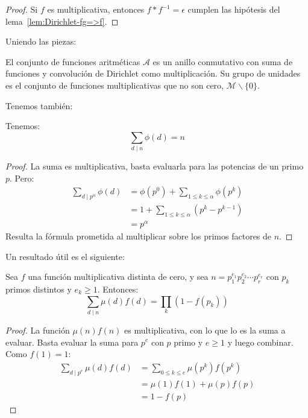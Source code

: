   \begin{proof}
    Si \(f\) es multiplicativa,
    entonces \(f * f^{-1} = \epsilon\)
    cumplen las hipótesis del lema~\ref{lem:Dirichlet-fg=>f}.
  \end{proof}
  Uniendo las piezas:
  \begin{theorem}
    \label{theo:Dirichlet-ring}
    El conjunto de funciones aritméticas%
    \(\mathscr{A}\) es un anillo conmutativo%
    con suma de funciones
    y convolución de Dirichlet como multiplicación.
    Su grupo de unidades
    es el conjunto de funciones multiplicativas
    que no son cero,
    \(\mathscr{M} \smallsetminus \{0\}\).
  \end{theorem}

  Tenemos también:
  \begin{theorem}
    \label{theo:Gauss-identity}
    Tenemos:
    \begin{equation*}
      \sum_{d \mid n} \phi(d)
	= n
    \end{equation*}
  \end{theorem}
  \begin{proof}
    La suma es multiplicativa,
    basta evaluarla para las potencias de un primo \(p\).
    Pero:
    \begin{align*}
      \sum_{d \mid p^\alpha} \phi(d)
	&= \phi(p^0) + \sum_{1 \le k \le \alpha} \phi(p^k) \\
	&= 1 + \sum_{1 \le k \le \alpha} (p^k - p^{k - 1}) \\
	&= p^\alpha
    \end{align*}
    Resulta la fórmula prometida
    al multiplicar sobre los primos factores de \(n\).
  \end{proof}
  Un resultado útil es el siguiente:
  \begin{theorem}
    \label{theo:sum-mu-f}
    Sea \(f\) una función multiplicativa distinta de cero,
    y sea \(n = p_1^{e_1} p_2^{e_2} \dotsm p_r^{e_r}\)
    con \(p_k\) primos distintos y \(e_k \ge 1\).
    Entonces:
    \begin{equation}
      \label{eq:sum-mu-f}
      \sum_{d \mid n} \mu(d) f(d)
	= \prod_k (1 - f(p_k))
    \end{equation}
  \end{theorem}
  \begin{proof}
    La función \(\mu(n) f(n)\) es multiplicativa,
    con lo que lo es la suma a evaluar.
    Basta evaluar la suma para \(p^e\)
    con \(p\) primo y \(e \ge 1\)
    y luego combinar.
    Como \(f(1) = 1\):
    \begin{align*}
      \sum_{d \mid p^e} \mu(d) f(d)
	&= \sum_{0 \le k \le e} \mu(p^k) f(p^k) \\
	&= \mu(1) f(1) + \mu(p) f(p) \\
	&= 1 - f(p)
    \end{align*}
  \end{proof}


